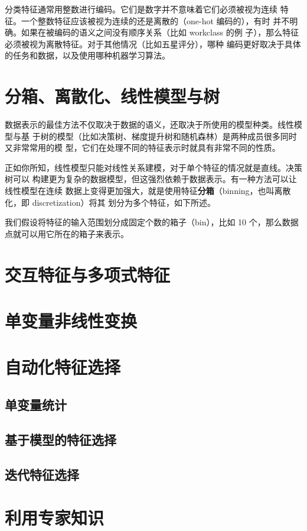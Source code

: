 \begin{tcolorbox}
    分类特征通常用整数进行编码。它们是数字并不意味着它们必须被视为连续
    特征。一个整数特征应该被视为连续的还是离散的（one-hot 编码的），有时
    并不明确。如果在被编码的语义之间没有顺序关系（比如 workclass 的例
    子），那么特征必须被视为离散特征。对于其他情况（比如五星评分），哪种
    编码更好取决于具体的任务和数据，以及使用哪种机器学习算法。
\end{tcolorbox}
\section{分箱、离散化、线性模型与树}
数据表示的最佳方法不仅取决于数据的语义，还取决于所使用的模型种类。线性模型与基
于树的模型（比如决策树、梯度提升树和随机森林）是两种成员很多同时又非常常用的模
型，它们在处理不同的特征表示时就具有非常不同的性质。

正如你所知，线性模型只能对线性关系建模，对于单个特征的情况就是直线。决策树可以
构建更为复杂的数据模型，但这强烈依赖于数据表示。有一种方法可以让线性模型在连续
数据上变得更加强大，就是使用特征\textbf{分箱}（binning，也叫离散化，即 discretization）将其
划分为多个特征，如下所述。

我们假设将特征的输入范围划分成固定个数的箱子（bin），比如 10 个，那么数据点就可以用它所在的箱子来表示。
\section{交互特征与多项式特征}
\section{单变量非线性变换}
\section{自动化特征选择}
\subsection{单变量统计}
\subsection{基于模型的特征选择}
\subsection{迭代特征选择}
\section{利用专家知识}
